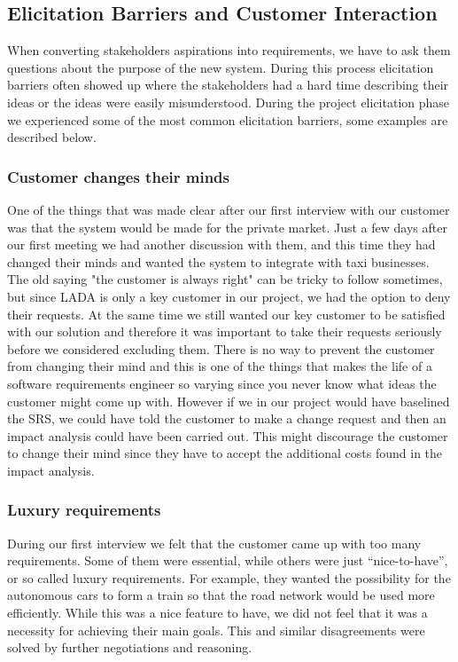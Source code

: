 \documentclass[10pt]{article}
\begin{document}
\subsection{Elicitation Barriers and Customer Interaction}
\label{barriers}
When converting stakeholders aspirations into requirements, we  have to ask them questions about the purpose of the new system. During this process elicitation barriers often showed up where the stakeholders had a hard time describing their ideas or the ideas were easily misunderstood. During the project elicitation phase we experienced some of the most common elicitation barriers, some examples are described below.

\subsubsection{Customer changes their minds}
One of the things that was made clear after our first interview with our customer was that the system would be made for the private market. Just a few days after our first meeting we had another discussion with them, and this time they had changed their minds and wanted the system to integrate with taxi businesses. The old saying "the customer is always right" can be tricky to follow sometimes, but since LADA is only a key customer in our project, we had the option to deny their requests. At the same time we still wanted our key customer to be satisfied with our solution and therefore it was important to take their requests seriously before we considered excluding them.
\newline 
\indent
There is no way to prevent the customer from changing their mind and this is one of the things that makes the life of a software requirements engineer so varying since you never know what ideas the customer might come up with. However if we in our project would have baselined the SRS, we could have told the customer to make a change request and then an impact analysis could have been carried out. This might discourage the customer to change their mind since they have to accept the additional costs found in the impact analysis.

\subsubsection{Luxury requirements}
During our first interview we felt that the customer came up with too many requirements. Some of them were essential, while others were just “nice-to-have”, or so called luxury requirements. For example, they wanted the possibility for the autonomous cars to form a train so that the road network would be used more efficiently. While this was a nice feature to have, we did not feel that it was a necessity for achieving their main goals. This and similar disagreements were solved by further negotiations and reasoning. 
\end{document}
